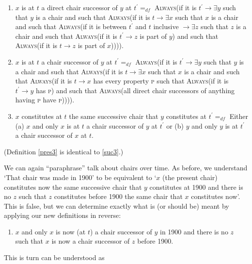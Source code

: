 \documentclass[11pt]{article}
\begin{document}
\begin{spacing}{1.5}
\begin{enumerate}[label=\arabic*a., ref=\arabic*a]
  \item $x$ is at $t$ a direct chair successor of $y$ at $t^{\prime}
    =_{df}$ \textsc{Always}(if it is $t^{\prime} \rightarrow \exists
    y$ such that $y$ is a chair and such that \textsc{Always}(if it is
    $t \rightarrow \exists x$ such that $x$ is a chair and such that
    \textsc{Always}(if it is between $t^{\prime}$ and $t$ inclusive
    $\rightarrow \exists z$ such that $z$ is a chair and such that
    \textsc{Always}(if it is $t^{\prime} \rightarrow z$ is part of
    $y$) and such that \textsc{Always}(if it is $t \rightarrow z$ is
    part of $x$)))). \label{pres1}
  \item $x$ is at $t$ a chair successor of $y$ at $t^{\prime} =_{df}$
    \textsc{Always}(if it is $t^{\prime} \rightarrow \exists y$ such
    that $y$ is a chair and such that \textsc{Always}(if it is $t
    \rightarrow \exists x$ such that $x$ is a chair and such that
    \textsc{Always}(if it is $t \rightarrow x$ has every property
    \textsc{p} such that \textsc{Always}(if it is $t^{\prime}
    \rightarrow y$ has \textsc{p}) and such that \textsc{Always}(all
    direct chair successors of anything having \textsc{p} have
    \textsc{p})))). \label{pres2}
  \item $x$ constitutes at $t$ the same successive chair that $y$
    constitutes at $t^{\prime} =_{df}$ Either (a) $x$ and only $x$ is
    at $t$ a chair successor of $y$ at $t^{\prime}$ or (b) $y$ and
    only $y$ is at $t^{\prime}$ a chair successor of $x$ at
    $t$. \label{pres3}
\end{enumerate}
(Definition \ref{pres3} is identical to \ref{suc3}.)

We can again ``paraphrase'' talk about chairs over time.  As before,
we understand `That chair was made in 1900' to be equivalent to `$x$
(the present chair) constitutes now the same successive chair that $y$
constitutes at 1900 and there is no $z$ such that $z$ constitutes
before 1900 the same chair that $x$ constitutes now'.  This is false,
but we can determine exactly what is (or should be) meant by applying
our new definitions in reverse:

\begin{enumerate}[label=3a.]
  \item $x$ and only $x$ is now (at $t$) a chair successor of $y$ in
    1900 and there is no $z$ such that $x$ is now a chair successor of
    $z$ before 1900.
\end{enumerate}
This is turn can be understood as


\end{spacing}
\end{document}
